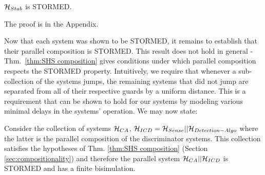 \begin{lemma}
	\label{lemma:stability}
	$\mathcal{H}_{Stab}$ is STORMED.	
\end{lemma}
The proof is in the Appendix.

Now that each system was shown to be STORMED, it remains to establish that their parallel composition is STORMED.
This result does not hold in general - Thm.~\ref{thm:SHS composition} gives conditions under which parallel composition respects the STORMED property.
Intuitively, we require that whenever a sub-collection of the systems jumps, the remaining systems that did not jump are separated from all of their respective guards by a uniform distance.
This is a requirement that can be shown to hold for our systems by modeling various minimal delays in the systems' operation. 
We may now state:
\begin{thm}
Consider the collection of systems $\mathcal{H}_{CA}$, $\mathcal{H}_{ICD} = \mathcal{H}_{Sense} || \mathcal{H}_{Detection-Algo}$ where the latter is the parallel composition of the discriminator systems.
This collection satisfies the hypotheses of Thm. \ref{thm:SHS composition} (Section \ref{sec:compositionality}) and therefore the parallel system  $\mathcal{H}_{CA} || \mathcal{H}_{ICD}$ is STORMED and has a finite bisimulation.
\end{thm}